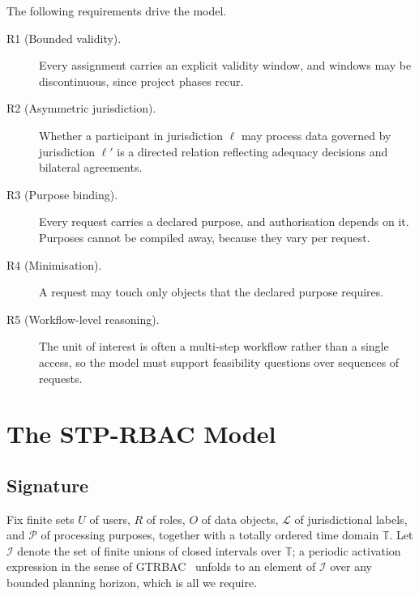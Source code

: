 \documentclass[11pt]{article}
\theoremstyle{definition}
\theoremstyle{plain}
\theoremstyle{remark}
\newcommand{\Tdom}{\mathbb{T}}
\newcommand{\Ldom}{\mathcal{L}}
\newcommand{\Pdom}{\mathcal{P}}
\begin{document}
The following requirements drive the model.

\begin{description}
  \item[R1 (Bounded validity).] Every assignment carries an explicit validity
        window, and windows may be discontinuous, since project phases recur.
  \item[R2 (Asymmetric jurisdiction).] Whether a participant in jurisdiction
        $\ell$ may process data governed by jurisdiction $\ell'$ is a directed
        relation reflecting adequacy decisions and bilateral agreements.
  \item[R3 (Purpose binding).] Every request carries a declared purpose, and
        authorisation depends on it. Purposes cannot be compiled away, because
        they vary per request.
  \item[R4 (Minimisation).] A request may touch only objects that the declared
        purpose requires.
  \item[R5 (Workflow-level reasoning).] The unit of interest is often a
        multi-step workflow rather than a single access, so the model must
        support feasibility questions over sequences of requests.
\end{description}

\section{The STP-RBAC Model}
\label{sec:model}

\subsection{Signature}

Fix finite sets $U$ of users, $R$ of roles, $O$ of data objects, $\Ldom$ of
jurisdictional labels, and $\Pdom$ of processing purposes, together with a
totally ordered time domain $\Tdom$. Let $\mathcal{I}$ denote the set of finite
unions of closed intervals over $\Tdom$; a periodic activation expression in the
sense of GTRBAC~\citep{joshi2005gtrbac} unfolds to an element of $\mathcal{I}$
over any bounded planning horizon, which is all we require.
\end{document}
